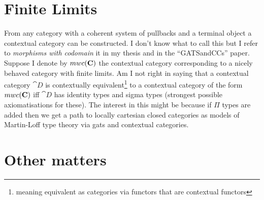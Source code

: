 
\section{Finite Limits}
\mynote 
 From any category with a coherent system of pullbacks and a terminal object a contextual category can be constructed. I don't know what to call this but 
I refer to \textit{morphisms with codomain} it in my thesis and in the ``GATSandCCs'' paper.
Suppose I denote by $mwc(\textbf{C})$ the contextual category corresponding to a nicely behaved category \catcw with finite limits. Am I not right in saying that a contextual category $\cat{D}$ is contextually equivalent\footnote{meaning equivalent as categories via functors that are contextual functors} to 
a contextual category of the form $mwc(\textbf{C})$ iff $\cat{D}$ has identity types and sigma types
(strongest possible axiomatisations for these). The interest in this might be because if $\Pi$ types are added then we get  a path to locally cartesian closed categories as models of Martin-Loff type theory via gats and contextual categories. 

\section{Other matters}

